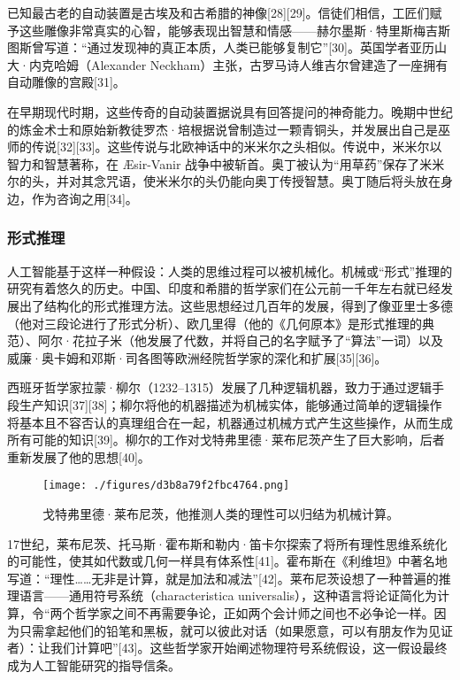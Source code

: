 已知最古老的自动装置是古埃及和古希腊的神像[28][29]。信徒们相信，工匠们赋予这些雕像非常真实的心智，能够表现出智慧和情感——赫尔墨斯·特里斯梅吉斯图斯曾写道：“通过发现神的真正本质，人类已能够复制它”[30]。英国学者亚历山大·内克哈姆（Alexander Neckham）主张，古罗马诗人维吉尔曾建造了一座拥有自动雕像的宫殿[31]。

在早期现代时期，这些传奇的自动装置据说具有回答提问的神奇能力。晚期中世纪的炼金术士和原始新教徒罗杰·培根据说曾制造过一颗青铜头，并发展出自己是巫师的传说[32][33]。这些传说与北欧神话中的米米尔之头相似。传说中，米米尔以智力和智慧著称，在 Æsir-Vanir 战争中被斩首。奥丁被认为“用草药”保存了米米尔的头，并对其念咒语，使米米尔的头仍能向奥丁传授智慧。奥丁随后将头放在身边，作为咨询之用[34]。
\subsubsection{形式推理}
人工智能基于这样一种假设：人类的思维过程可以被机械化。机械或“形式”推理的研究有着悠久的历史。中国、印度和希腊的哲学家们在公元前一千年左右就已经发展出了结构化的形式推理方法。这些思想经过几百年的发展，得到了像亚里士多德（他对三段论进行了形式分析）、欧几里得（他的《几何原本》是形式推理的典范）、阿尔·花拉子米（他发展了代数，并将自己的名字赋予了“算法”一词）以及威廉·奥卡姆和邓斯·司各图等欧洲经院哲学家的深化和扩展[35][36]。

西班牙哲学家拉蒙·柳尔（1232–1315）发展了几种逻辑机器，致力于通过逻辑手段生产知识[37][38]；柳尔将他的机器描述为机械实体，能够通过简单的逻辑操作将基本且不容否认的真理组合在一起，机器通过机械方式产生这些操作，从而生成所有可能的知识[39]。柳尔的工作对戈特弗里德·莱布尼茨产生了巨大影响，后者重新发展了他的思想[40]。
\begin{figure}[ht]
\centering
\texttt{[image: ./figures/d3b8a79f2fbc4764.png]}
\caption{戈特弗里德·莱布尼茨，他推测人类的理性可以归结为机械计算。} \label{fig_RGZN_3}
\end{figure}
17世纪，莱布尼茨、托马斯·霍布斯和勒内·笛卡尔探索了将所有理性思维系统化的可能性，使其如代数或几何一样具有体系性[41]。霍布斯在《利维坦》中著名地写道：“理性……无非是计算，就是加法和减法”[42]。莱布尼茨设想了一种普遍的推理语言——通用符号系统（characteristica universalis），这种语言将论证简化为计算，令“两个哲学家之间不再需要争论，正如两个会计师之间也不必争论一样。因为只需拿起他们的铅笔和黑板，就可以彼此对话（如果愿意，可以有朋友作为见证者）：让我们计算吧”[43]。这些哲学家开始阐述物理符号系统假设，这一假设最终成为人工智能研究的指导信条。

